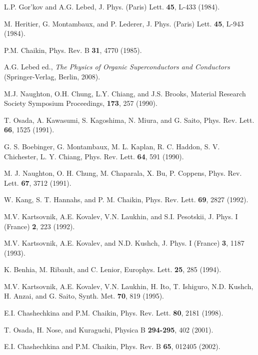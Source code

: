 \documentclass[prl,aps,showpacs,twocolumn,floatfix]{revtex4}
\begin{document}
\begin{references}

L.P. Gor'kov and A.G. Lebed, J. Phys. (Paris) Lett. \textbf{45},
L-433 (1984).

M. Heritier, G. Montambaux, and P. Lederer, J. Phys. (Paris) Lett.
\textbf{45}, L-943 (1984).

P.M. Chaikin, Phys. Rev. B \textbf{31}, 4770 (1985).

A.G. Lebed ed., {\it The Physics of Organic Superconductors and
Conductors} (Springer-Verlag, Berlin, 2008).

M.J. Naughton, O.H. Chung, L.Y. Chiang, and J.S. Brooks, Material
Research Society Symposium Proceedings, \textbf{173}, 257 (1990).

T. Osada, A. Kawasumi, S. Kagoshima, N. Miura, and G. Saito, Phys.
Rev. Lett. \textbf{66}, 1525 (1991).

 G. S. Boebinger, G. Montambaux, M. L. Kaplan, R. C. Haddon, S.
V. Chichester, L. Y. Chiang, Phys. Rev. Lett. \textbf{64}, 591
(1990).

M. J. Naughton, O. H. Chung, M. Chaparala, X. Bu, P. Coppens,
Phys. Rev. Lett. \textbf{67}, 3712 (1991).

W. Kang, S. T. Hannahs, and P. M. Chaikin, Phys. Rev. Lett.
\textbf{69}, 2827 (1992).

M.V. Kartsovnik, A.E. Kovalev, V.N. Laukhin, and S.I. Pesotskii,
J. Phys. I (France) \textbf{2}, 223 (1992).

M.V. Kartsovnik, A.E. Kovalev, and N.D. Kushch, J. Phys. I
(France) \textbf{3}, 1187 (1993).

K. Benhia, M. Ribault, and C. Lenior, Europhys. Lett. \textbf{25},
285 (1994).

M.V. Kartsovnik, A.E. Kovalev, V.N. Laukhin, H. Ito, T. Ishiguro,
N.D. Kushch, H. Anzai, and G. Saito, Synth. Met. \textbf{70}, 819
(1995).

E.I. Chashechkina and P.M. Chaikin, Phys. Rev. Lett. \textbf{80},
2181 (1998).

T. Osada, H. Nose, and Kuraguchi, Physica B \textbf{294-295}, 402
(2001).

E.I. Chashechkina and P.M. Chaikin, Phys. Rev. B \textbf{65},
012405 (2002).


\end{references}
\end{document}
